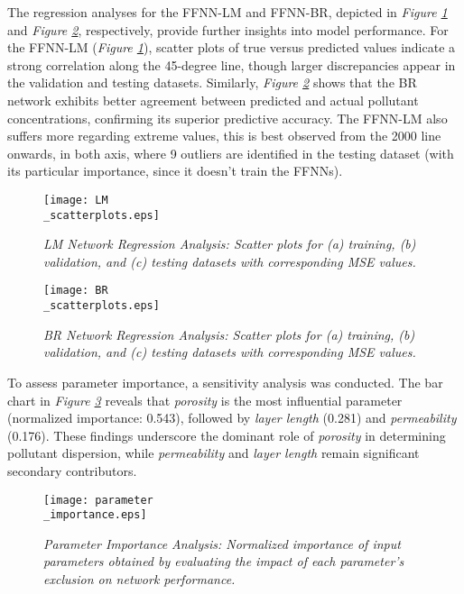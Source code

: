 \documentclass[10pt]{article}
\begin{document}
	The regression analyses for the FFNN-LM and FFNN-BR, depicted in \textit{Figure \ref{fig:lm_sct}} and \textit{Figure \ref{fig:br_sct}}, respectively, provide further insights into model performance. For the FFNN-LM (\textit{Figure \ref{fig:lm_sct}}), scatter plots of true versus predicted values indicate a strong correlation along the 45-degree line, though larger discrepancies appear in the validation and testing datasets. Similarly, \textit{Figure \ref{fig:br_sct}} shows that the BR network exhibits better agreement between predicted and actual pollutant concentrations, confirming its superior predictive accuracy. The FFNN-LM also suffers more regarding extreme values, this is best observed from the 2000 line onwards,  in both axis, where 9 outliers are identified in the testing dataset (with its particular importance, since it doesn't train the FFNNs).
	
	\begin{figure}[H]
		\centering
		\texttt{[image: LM\\\_scatterplots.eps]}
		\caption{\textit{LM Network Regression Analysis: Scatter plots for (a) training, (b) validation, and (c) testing datasets with corresponding MSE values.}}
		\label{fig:lm_sct}
	\end{figure}
	
	\begin{figure}[H]
		\centering
		\texttt{[image: BR\\\_scatterplots.eps]}
		\caption{\textit{BR Network Regression Analysis: Scatter plots for (a) training, (b) validation, and (c) testing datasets with corresponding MSE values.}}
		\label{fig:br_sct}
	\end{figure}
	
	To assess parameter importance, a sensitivity analysis was conducted. The bar chart in \textit{Figure \ref{fig:param_imp}} reveals that \textit{porosity} is the most influential parameter (normalized importance: 0.543), followed by \textit{layer length} (0.281) and \textit{permeability} (0.176). These findings underscore the dominant role of \textit{porosity} in determining pollutant dispersion, while \textit{permeability} and \textit{layer length} remain significant secondary contributors.
	
	\begin{figure}[H]
		\centering
		\texttt{[image: parameter\\\_importance.eps]}
		\caption{\textit{Parameter Importance Analysis: Normalized importance of input parameters obtained by evaluating the impact of each parameter's exclusion on network performance.}}
		\label{fig:param_imp}
	\end{figure}
	
\end{document}
